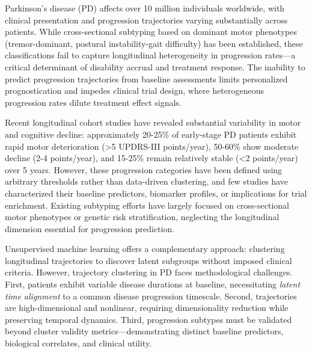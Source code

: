 Parkinson's disease (PD) affects over 10 million individuals worldwide\cite{dorsey2018global}, with clinical presentation and progression trajectories varying substantially across patients\cite{fereshtehnejad2017subtypes,post2007progression}. While cross-sectional subtyping based on dominant motor phenotypes (tremor-dominant, postural instability-gait difficulty) has been established\cite{jankovic1990variable}, these classifications fail to capture longitudinal heterogeneity in progression rates—a critical determinant of disability accrual and treatment response\cite{latourelle2017large}. The inability to predict progression trajectories from baseline assessments limits personalized prognostication and impedes clinical trial design, where heterogeneous progression rates dilute treatment effect signals\cite{simuni2016predictors}.

Recent longitudinal cohort studies have revealed substantial variability in motor and cognitive decline: approximately 20-25\% of early-stage PD patients exhibit rapid motor deterioration (>5 UPDRS-III points/year), 50-60\% show moderate decline (2-4 points/year), and 15-25\% remain relatively stable (<2 points/year) over 5 years\cite{post2007progression,lawton2018developing}. However, these progression categories have been defined using arbitrary thresholds rather than data-driven clustering, and few studies have characterized their baseline predictors, biomarker profiles, or implications for trial enrichment. Existing subtyping efforts have largely focused on cross-sectional motor phenotypes\cite{fereshtehnejad2017subtypes} or genetic risk stratification\cite{nalls2019identification}, neglecting the longitudinal dimension essential for progression prediction.

Unsupervised machine learning offers a complementary approach: clustering longitudinal trajectories to discover latent subgroups without imposed clinical criteria\cite{schulam2019can,marquand2016conceptualizing}. However, trajectory clustering in PD faces methodological challenges. First, patients exhibit variable disease durations at baseline, necessitating \textit{latent time alignment} to a common disease progression timescale\cite{donohue2014preclinical}. Second, trajectories are high-dimensional and nonlinear, requiring dimensionality reduction while preserving temporal dynamics\cite{schulam2019can}. Third, progression subtypes must be validated beyond cluster validity metrics—demonstrating distinct baseline predictors, biological correlates, and clinical utility.


